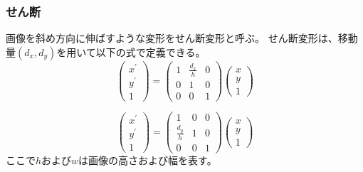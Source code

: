     \subsubsection{せん断}
        画像を斜め方向に伸ばすような変形をせん断変形と呼ぶ。
        せん断変形は、移動量$(d_x, d_y)$を用いて以下の式で定義できる。
        \begin{equation}
            \left(\begin{array}{l}
            x^{\prime} \\
            y^{\prime} \\
            1
            \end{array}\right)
            =
            \left(\begin{array}{lll}
            1 & \frac{d_x}{h} & 0\\
            0 & 1 & 0\\
            0 & 0 & 1
            \end{array}\right)
            \left(\begin{array}{l}
            x \\
            y \\
            1
            \end{array}\right)
            \label{Xsharing}
        \end{equation}

        \begin{equation}
            \left(\begin{array}{l}
            x^{\prime} \\
            y^{\prime} \\
            1
            \end{array}\right)
            =
            \left(\begin{array}{lll}
            1 & 0 & 0\\
            \frac{d_y}{h} & 1 & 0\\
            0 & 0 & 1
            \end{array}\right)
            \left(\begin{array}{l}
            x \\
            y \\
            1
            \end{array}\right)
            \label{Ysharing}
        \end{equation}
        ここで$h$および$w$は画像の高さおよび幅を表す。

